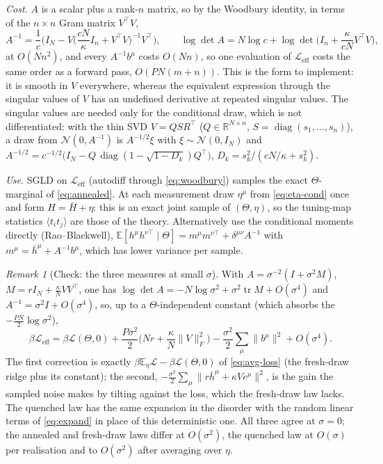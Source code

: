 \documentclass[11pt,a4paper]{article}
\newcommand{\R}{\mathbb R}
\newcommand{\E}{\mathbb E}
\newcommand{\Lc}{\mathcal L}
\newcommand{\Leff}{\mathcal L_{\mathrm{eff}}}
\newcommand{\tr}{\operatorname{tr}}
\newcommand{\hb}{\bar h}
\theoremstyle{remark}
\newtheorem{remark}{Remark}
\begin{document}
\emph{Cost.} $A$ is a scalar plus a rank-$n$ matrix, so by the Woodbury
identity, in terms of the $n\times n$ Gram matrix $V^\top V$,
\begin{equation}
  A^{-1} = \frac1c\Big(I_N - V\Big(\frac{cN}{\kappa}I_n + V^\top V\Big)^{-1}V^\top\Big),
  \qquad
  \log\det A = N\log c + \log\det\Big(I_n + \frac{\kappa}{cN}V^\top V\Big),
  \label{eq:woodbury}
\end{equation}
at $O(Nn^2)$, and every $A^{-1}b^\mu$ costs $O(Nn)$, so one evaluation of
$\Leff$ costs the same order as a forward pass, $O(PN(m+n))$. This is the
form to implement: it is smooth in $V$ everywhere, whereas the equivalent
expression through the singular values of $V$ has an undefined derivative at
repeated singular values. The singular values are needed only for the
conditional draw, which is not differentiated: with the thin SVD
$V = QSR^\top$ ($Q\in\R^{N\times n}$, $S = \operatorname{diag}(s_1,\dots,s_n)$),
a draw from $\mathcal N(0,A^{-1})$ is $A^{-1/2}\xi$ with $\xi\sim\mathcal N(0,I_N)$
and $A^{-1/2} = c^{-1/2}\big(I_N - Q\,\operatorname{diag}(1 - \sqrt{1 - D_k})Q^\top\big)$,
$D_k = s_k^2/(cN/\kappa + s_k^2)$.

\emph{Use.} SGLD on $\Leff$ (autodiff through \eqref{eq:woodbury}) samples the
exact $\Theta$-marginal of \eqref{eq:annealed}. At each measurement draw
$\eta^\mu$ from \eqref{eq:eta-cond} once and form $H = \bar H + \eta$: this
is an exact joint sample of $(\Theta,\eta)$, so the tuning-map statistics
$\langle t_it_j\rangle$ are those of the theory. Alternatively use the
conditional moments directly (Rao--Blackwell),
$\E[h^\mu h^{\nu\top}\mid\Theta] = m^\mu m^{\nu\top} + \delta^{\mu\nu}A^{-1}$
with $m^\mu = \hb^\mu + A^{-1}b^\mu$, which has lower variance per sample.

\begin{remark}[Check: the three measures at small $\sigma$]
\label{rem:small-sigma}
With $A = \sigma^{-2}(I + \sigma^2 M)$, $M = rI_N + \frac\kappa N VV^\top$,
one has $\log\det A = -N\log\sigma^2 + \sigma^2\tr M + O(\sigma^4)$ and
$A^{-1} = \sigma^2 I + O(\sigma^4)$, so, up to a $\Theta$-independent
constant (which absorbs the $-\frac{PN}{2}\log\sigma^2$),
\begin{equation}
  \beta\Leff = \beta\Lc(\Theta,0) + \frac{P\sigma^2}{2}\Big(Nr + \frac{\kappa}{N}\|V\|_F^2\Big)
  - \frac{\sigma^2}{2}\sum_\mu\|b^\mu\|^2 + O(\sigma^4) .
\end{equation}
The first correction is exactly $\beta\E_\eta\Lc - \beta\Lc(\Theta,0)$ of
\eqref{eq:avg-loss} (the fresh-draw ridge plus its constant); the second,
$-\frac{\sigma^2}2\sum_\mu\|r\hb^\mu + \kappa Ve^\mu\|^2$, is the gain the
sampled noise makes by tilting against the loss, which the fresh-draw law
lacks. The quenched law has the same expansion in the disorder with the
random linear terms of \eqref{eq:expand} in place of this deterministic one.
All three agree at $\sigma = 0$; the annealed and fresh-draw laws differ at
$O(\sigma^2)$, the quenched law at $O(\sigma)$ per realisation and to
$O(\sigma^2)$ after averaging over $\eta$.
\end{remark}
\end{document}

